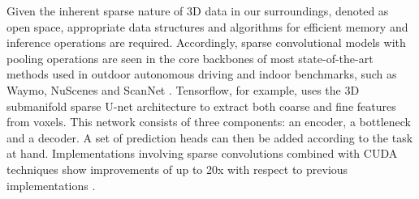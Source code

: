 Given the inherent sparse nature of 3D data in our surroundings, denoted as open space, appropriate data structures and algorithms for efficient memory and inference operations are required. Accordingly, sparse convolutional models with pooling operations are seen in the core backbones of most state-of-the-art methods used in outdoor autonomous driving and indoor benchmarks, such as Waymo, NuScenes and ScanNet \cite{najibi2020dops}.
Tensorflow, for example, uses the 3D submanifold sparse U-net architecture to extract both coarse and fine features from voxels. 
This network consists of three components: an encoder, a bottleneck and a decoder. A set of prediction heads can then be added according to the task at hand. Implementations involving sparse convolutions combined with CUDA techniques show improvements of up to 20x with respect to previous implementations \cite{najibi2020dops}.







